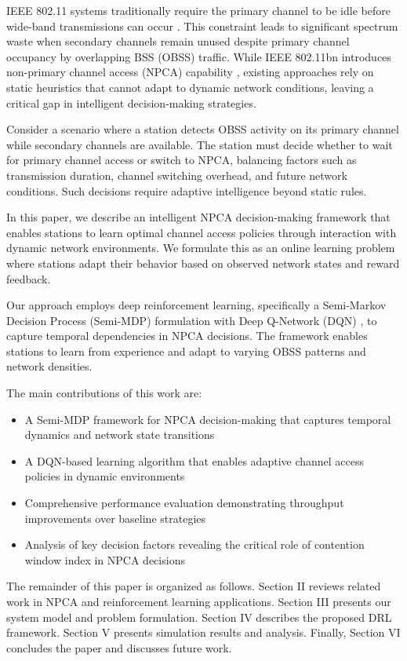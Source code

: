 \documentclass[conference]{IEEEtran}
\begin{document}
IEEE 802.11 systems traditionally require the primary channel to be idle before wide-band transmissions can occur \cite{wei2024non}. This constraint leads to significant spectrum waste when secondary channels remain unused despite primary channel occupancy by overlapping BSS (OBSS) traffic. While IEEE 802.11bn introduces non-primary channel access (NPCA) capability \cite{bellalta2025performance}, existing approaches rely on static heuristics that cannot adapt to dynamic network conditions, leaving a critical gap in intelligent decision-making strategies.

Consider a scenario where a station detects OBSS activity on its primary channel while secondary channels are available. The station must decide whether to wait for primary channel access or switch to NPCA, balancing factors such as transmission duration, channel switching overhead, and future network conditions. Such decisions require adaptive intelligence beyond static rules. 

In this paper, we describe an intelligent NPCA decision-making framework that enables stations to learn optimal channel access policies through interaction with dynamic network environments. We formulate this as an online learning problem where stations adapt their behavior based on observed network states and reward feedback.

Our approach employs deep reinforcement learning, specifically a Semi-Markov Decision Process (Semi-MDP) formulation with Deep Q-Network (DQN) \cite{mnih2013playing, mnih2015human}, to capture temporal dependencies in NPCA decisions. The framework enables stations to learn from experience and adapt to varying OBSS patterns and network densities.

The main contributions of this work are:
\begin{itemize}
\item A Semi-MDP framework for NPCA decision-making that captures temporal dynamics and network state transitions
\item A DQN-based learning algorithm that enables adaptive channel access policies in dynamic environments  
\item Comprehensive performance evaluation demonstrating throughput improvements over baseline strategies
\item Analysis of key decision factors revealing the critical role of contention window index in NPCA decisions
\end{itemize}

The remainder of this paper is organized as follows. Section II reviews related work in NPCA and reinforcement learning applications. Section III presents our system model and problem formulation. Section IV describes the proposed DRL framework. Section V presents simulation results and analysis. Finally, Section VI concludes the paper and discusses future work.
\end{document}
